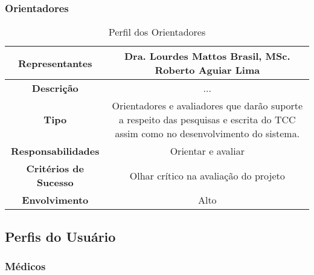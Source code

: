\begin{anexosenv}
	\subsubsection{Orientadores}

	\begin{table}[]
		\centering
		\caption{Perfil dos Orientadores}
		\begin{tabular}{@{}|c|c|@{}}
			\toprule
			\textbf{Representantes}       & Dra. Lourdes Mattos Brasil, MSc. Roberto Aguiar Lima                                                                             \\ \midrule
			\textbf{Descrição}            & ...                                                                                                                              \\ \midrule
			\textbf{Tipo}                 & Orientadores e avaliadores que darão suporte a respeito das pesquisas e escrita do TCC assim como no desenvolvimento do sistema. \\ \midrule
			\textbf{Responsabilidades}    & Orientar e avaliar                                                                                                               \\ \midrule
			\textbf{Critérios de Sucesso} & Olhar crítico na avaliação do projeto                                                                                            \\ \midrule
			\textbf{Envolvimento}         & Alto                                                                                                                             \\ \bottomrule
		\end{tabular}
		\label{table:Perfil dos Orientadores}
	\end{table}

	\subsection{Perfis do Usuário}

	\subsubsection{Médicos}


\end{anexosenv}
